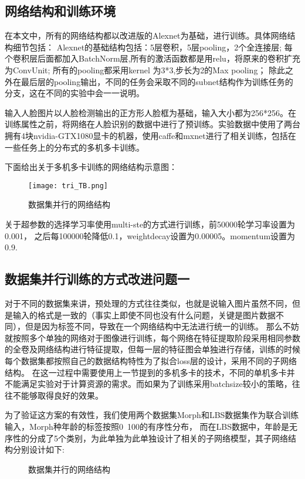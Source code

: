 \subsection{网络结构和训练环境}
在本文中，所有的网络结构都以改进版的Alexnet为基础，进行训练。具体网络结构细节包括：
Alexnet的基础结构包括：5层卷积，5层pooling，2个全连接层;
每个卷积层后面都加入BatchNorm层,所有的激活函数都是用relu，将原来的卷积扩充为ConvUnit;
所有的pooling都采用kernel 为3*3,步长为2的Max pooling；
除此之外在最后层的pooling输出，不同的任务会采取不同的subnet结构作为训练任务的分支，这在不同的实验中会一一说明。

输入人脸图片以人脸检测输出的正方形人脸框为基础，输入大小都为256*256。在训练属性之前，将网络在人脸识别的数据中进行了预训练。实验数据中使用了两台拥有4块nvidia-GTX1080显卡的机器，使用caffe和mxnet\cite{MXNET}进行了相关训练，包括在一些任务上的分布式的多机多卡训练。

下面给出关于多机多卡训练的网络结构示意图：
 \begin{figure}[!ht]
 \centering
	\texttt{[image: tri\_TB.png]}
	\caption{数据集并行的网络结构}
\end{figure}
关于超参数的选择学习率使用multi-ste的方式进行训练，前50000轮学习率设置为0.001，
之后每100000轮降低0.1，weightdecay设置为0.00005。momentum设置为0.9.

\subsection{数据集并行训练的方式改进问题一}
对于不同的数据集来讲，预处理的方式往往类似，也就是说输入图片虽然不同，但是输入的格式是一致的（事实上即使不同也没有什么问题，关键是图片数据不同），但是因为标签不同，导致在一个网络结构中无法进行统一的训练。
那么不妨就按照多个单独的网络对于图像进行训练，每个网络在特征提取阶段采用相同参数的全卷及网络结构进行特征提取，但每一层的特征图会单独进行存储，训练的时候每个数据集都按照自己的数据结构特性为了拟合loss层的设计，采用不同的子网络结构。	
在这一过程中需要使用上一节提到的多机多卡的技术，不同的单机多卡并不能满足实验对于计算资源的需求。而如果为了训练采用batchsize较小的策略，往往不能够取得良好的效果。

为了验证这方案的有效性，我们使用两个数据集Morph和LBS数据集作为联合训练输入，Morph种年龄的标签按照0~100的有序性分布，
而在LBS数据中，年龄是无序性的分成了5个类别，为此单独为此单独设计了相关的子网络模型，其子网络结构分别设计如下:
 \begin{figure}[!ht]
 \centering
	\caption{数据集并行的网络结构}
\end{figure}

